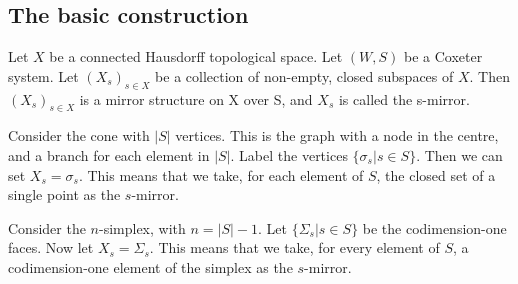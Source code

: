 \documentclass[11pt]{article}
\begin{document}
\subsection{The basic construction}
\begin{definition}
    Let $X$ be a connected Hausdorff topological space. Let $(W,S)$ be a Coxeter system. Let $(X_s)_{s\in X}$ be a collection of non-empty, closed subspaces of $X$. Then $(X_s)_{s\in X}$ is a mirror structure on X over S, and $X_s$ is called the s-mirror. 
\end{definition}

\begin{example}
    Consider the cone with $|S|$ vertices. This is the graph with a node in the centre, and a branch for each element in $|S|$. Label the vertices $\{\sigma_s|s\in S\}$. Then we can set $X_s=\sigma_s$. This means that we take, for each element of $S$, the closed set of a single point as the $s$-mirror.
\end{example}

\begin{example}
    Consider the $n$-simplex, with $n=|S|-1$. Let $\{\Sigma_s|s\in S\}$ be the codimension-one faces. Now let $X_s=\Sigma_s$. This means that we take, for every element of $S$, a codimension-one element of the simplex as the $s$-mirror.
\end{example}
\end{document}
